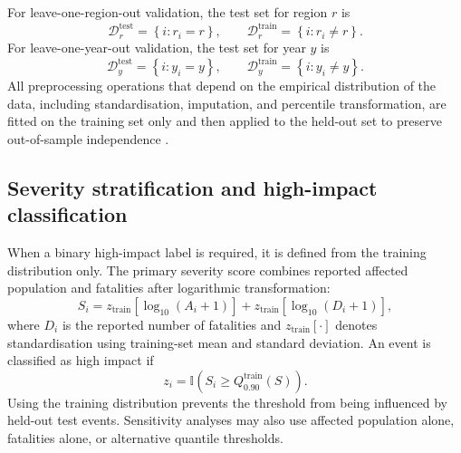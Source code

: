 \documentclass[pdflatex,sn-mathphys-ay]{sn-jnl}
\theoremstyle{thmstyleone}
\begin{document}
\begin{appendices}
For leave-one-region-out validation, the test set for region $r$ is
\begin{equation}
  \mathcal{D}^{\mathrm{test}}_{r}
  =
  \left\{
    i:r_i=r
  \right\},
  \qquad
  \mathcal{D}^{\mathrm{train}}_{r}
  =
  \left\{
    i:r_i\neq r
  \right\}.
  \label{eq:app_loro}
\end{equation}
For leave-one-year-out validation, the test set for year $y$ is
\begin{equation}
  \mathcal{D}^{\mathrm{test}}_{y}
  =
  \left\{
    i:y_i=y
  \right\},
  \qquad
  \mathcal{D}^{\mathrm{train}}_{y}
  =
  \left\{
    i:y_i\neq y
  \right\}.
  \label{eq:app_loyo}
\end{equation}
All preprocessing operations that depend on the empirical distribution
of the data, including standardisation, imputation, and percentile
transformation, are fitted on the training set only and then applied to
the held-out set to preserve out-of-sample independence
\citep{Kauffeldt2016,Kratzert2019}.

\subsection{Severity stratification and high-impact classification}
\label{app:severity_stratification}

When a binary high-impact label is required, it is defined from the
training distribution only.  The primary severity score combines
reported affected population and fatalities after logarithmic
transformation:
\begin{equation}
  S_i
  =
  z_{\mathrm{train}}
  \left[
    \log_{10}
    \left(
      A_i+1
    \right)
  \right]
  +
  z_{\mathrm{train}}
  \left[
    \log_{10}
    \left(
      D_i+1
    \right)
  \right],
  \label{eq:app_severity_score}
\end{equation}
where $D_i$ is the reported number of fatalities and
$z_{\mathrm{train}}[\cdot]$ denotes standardisation using training-set
mean and standard deviation.  An event is classified as high impact if
\begin{equation}
  z_i
  =
  \mathbb{I}
  \left(
    S_i
    \geq
    Q_{0.90}^{\mathrm{train}}(S)
  \right).
  \label{eq:app_high_impact}
\end{equation}
Using the training distribution prevents the threshold from being
influenced by held-out test events.  Sensitivity analyses may also use
affected population alone, fatalities alone, or alternative quantile
thresholds.


\end{appendices}
\end{document}
